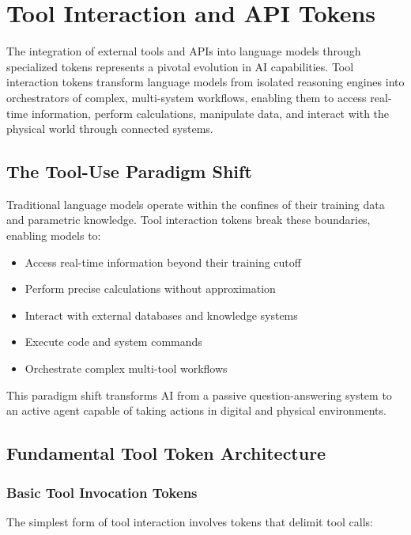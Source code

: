 \section{Tool Interaction and API Tokens}

The integration of external tools and APIs into language models through specialized tokens represents a pivotal evolution in AI capabilities. Tool interaction tokens transform language models from isolated reasoning engines into orchestrators of complex, multi-system workflows, enabling them to access real-time information, perform calculations, manipulate data, and interact with the physical world through connected systems.

\subsection{The Tool-Use Paradigm Shift}

Traditional language models operate within the confines of their training data and parametric knowledge. Tool interaction tokens break these boundaries, enabling models to:

\begin{itemize}
\item Access real-time information beyond their training cutoff
\item Perform precise calculations without approximation
\item Interact with external databases and knowledge systems
\item Execute code and system commands
\item Orchestrate complex multi-tool workflows
\end{itemize}

This paradigm shift transforms AI from a passive question-answering system to an active agent capable of taking actions in digital and physical environments.

\subsection{Fundamental Tool Token Architecture}

\subsubsection{Basic Tool Invocation Tokens}

The simplest form of tool interaction involves tokens that delimit tool calls:

